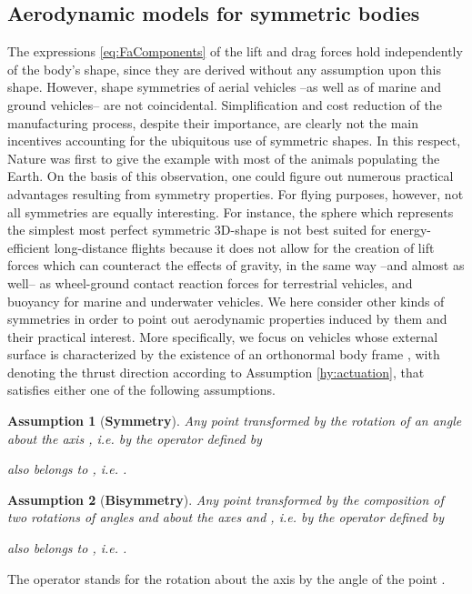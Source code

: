 \documentclass[twocolumn]{autart}
\newtheorem{hypothesis}{Assumption}
\theoremstyle{definition}
\theoremstyle{definition}
\begin{document}
\subsection{Aerodynamic models for symmetric bodies}

The expressions \eqref{eq:FaComponents} of the lift and drag forces hold independently of the body's shape, since they are derived without any assumption upon this shape. However, 
shape symmetries of aerial vehicles --as well as of marine and ground vehicles-- are not coincidental. Simplification and cost reduction of the manufacturing process, despite their importance, are clearly not the main incentives accounting for the ubiquitous use of symmetric shapes. In this respect, Nature was first to give the example with most of the animals populating the Earth. On the basis of this observation, one could figure out numerous practical advantages resulting from symmetry properties. For flying purposes, however, not all symmetries are equally interesting. For instance, the sphere which represents the simplest most perfect symmetric 3D-shape is not best suited for energy-efficient long-distance flights because it does not allow for the creation of lift forces which can counteract the effects of gravity, in the same way --and almost as well-- as wheel-ground contact reaction forces for terrestrial vehicles, and buoyancy for marine and underwater vehicles. 
We here consider other kinds of symmetries in order to point out aerodynamic properties induced by them and their practical interest. More specifically, we focus on vehicles whose external surface  is characterized by the existence of
an orthonormal body frame , with  denoting the thrust direction according to Assumption \ref{hy:actuation}, that satisfies either one of the following assumptions. 
\begin{hypothesis}[\textbf{Symmetry}]
  \label{hy:symmetries}
  Any point  transformed by the rotation of an angle  about the axis , i.e. by the operator defined by
  
  also belongs to , i.e. .
\end{hypothesis}
\begin{hypothesis}[\textbf{Bisymmetry}]
  \label{hy:bisymmetries}
  Any point  transformed by the composition of two rotations of angles  and  about the axes  and , i.e. by the operator defined by
  
  also belongs to , i.e. .
\end{hypothesis}
The operator  stands for the rotation about the axis  by the angle  of the point .
\end{document}

